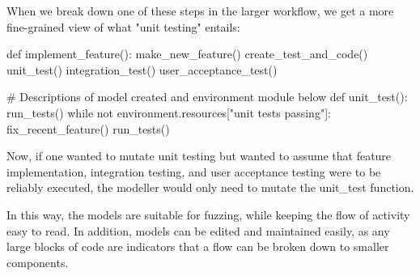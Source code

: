 When we break down one of these steps in the larger workflow, we get a more fine-grained view of what "unit testing" entails:
\begin{pyglist}[language = python, encoding = utf8]
def implement_feature():
    make_new_feature()
    create_test_and_code()
    unit_test()
    integration_test()
    user_acceptance_test()

# Descriptions of model created and environment module below
def unit_test():
    run_tests()
    while not environment.resources["unit tests passing"]:
        fix_recent_feature()
        run_tests()
\end{pyglist}\par
Now, if one wanted to mutate unit testing but wanted to assume that feature implementation, integration testing, and user acceptance testing were to be reliably executed, the modeller would only need to mutate the unit\_test\(\) function. \par
In this way, the models are suitable for fuzzing, while keeping the flow of activity easy to read. In addition, models can be edited and maintained easily, as any large blocks of code are indicators that a flow can be broken down to smaller components. \par
{}

